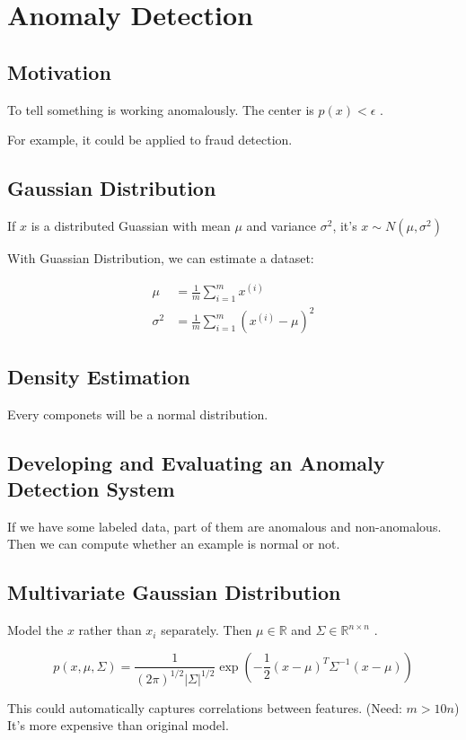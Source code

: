 \documentclass[en,11pt,english,black,simple]{../elegantbook}
\begin{document}
\fi 
\def\chapname{09AnomalyDetection}

\chapter{Anomaly Detection}


\section{Motivation}

To tell something is working anomalously. The center is \(p(x) < \epsilon\) .

For example, it could be applied to fraud detection. 

\section{Gaussian Distribution }

If \(x\) is a distributed Guassian with mean \(\mu\) and variance \(\sigma^2\), it's \(x \sim N(\mu, \sigma^2) \)

With Guassian Distribution, we can estimate a dataset: 

\[\begin{aligned}
    \mu &= \frac{1}{m} \sum_{i=1}^m x^{(i)} \\
    \sigma^2 &= \frac{1}{m} \sum_{i=1}^m (x^{(i)}-\mu)^2 
\end{aligned}\]

\section{Density Estimation} 

Every componets will be a normal distribution. 

\section{Developing and Evaluating an Anomaly Detection System}

If we have some labeled data, part of them are anomalous and non-anomalous. Then we can compute whether an example is normal or not.


\section{Multivariate Gaussian Distribution}

Model the \(x\) rather than \(x_i\) separately. Then \(\mu \in \mathbb{R}\) and \(\Sigma \in \mathbb{R}^{n\times n}\) .

\[p(x,\mu,\Sigma) = \frac{1}{(2\pi)^{1/2}|\Sigma|^{1/2}} \exp(-\frac{1}{2}(x-\mu)^T \Sigma^{-1} (x-\mu))\] 

This could automatically captures correlations between features. (Need: \(m > 10 n\)) It's more expensive than original model.



\let\chapname\undefined
\ifx\mainclass\undefined
\end{document}
